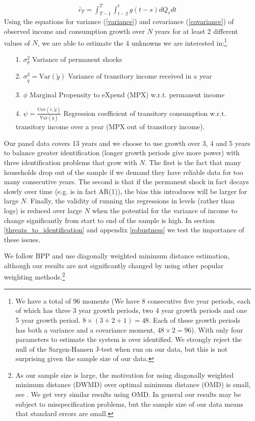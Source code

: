 \documentclass[titlepage]{\econtex}\newcommand{\texname}{ConsumptionHeterogeneity}
\begin{document}
\begin{align}
\tilde{c_T} = \int_{T-1}^{T}\int_{t-2}^{t} g(t-s)dQ_s dt \label{tot_cons}
\end{align}
Using the equations for variance (\ref{variance}) and covariance (\ref{covariance}) of observed income and consumption growth over $N$ years for at least 2 different values of $N$, we are able to estimate the 4 unknowns we are interested in:\footnote{We have a total of 96 moments (We have 8 consecutive five year periods, each of which has three 3 year growth periods, two 4 year growth periods and one 5 year growth period. $8\times(3+2+1)=48$. Each of these growth periods has both a variance and a covariance moment, $48\times 2 = 96$). With only four parameters to estimate the system is over identified. We strongly reject the null of the Sargen-Hansen J-test when run on our data, but this is not surprising given the sample size of our data.}
	\begin{itemize}
	\item[1.] $\sigma^2_p$ Variance of permanent shocks
	\item[2.] $\sigma^2_{\tilde{q}} = \mathrm{Var}(\tilde{y})$ Variance of transitory income received in a year
	\item[3.] $\phi$ Marginal Propensity to eXpend (MPX) w.r.t. permanent income
	\item[4.] $\psi = \frac{\mathrm{Cov}(\tilde{c},\tilde{y})}{\mathrm{Var}(\tilde{y})}$ Regression coefficient of transitory consumption w.r.t. transitory income over a year (MPX out of transitory income).
\end{itemize}
Our panel data covers 13 years and we choose to use growth over 3, 4 and 5 years to balance greater identification (longer growth periods give more power) with three identification problems that grow with $N$. The first is the fact that many households drop out of the sample if we demand they have reliable data for too many consecutive years. The second is that if the permanent shock in fact decays slowly over time (e.g. is in fact AR(1)), the bias this introduces will be larger for large $N$. Finally, the validity of running the regressions in levels (rather than logs) is reduced over large $N$ when the potential for the variance of income to change significantly from start to end of the sample is high. In section \ref{threats_to_identification} and appendix \ref{robustness} we test the importance of these issues.

We follow BPP and use diagonally weighted minimum distance estimation, although our results are not significantly changed by using other popular weighting methods.\footnote{As our sample size is large, the motivation for using diagonally weighted minimum distance (DWMD) over optimal minimum distance (OMD) is small, see \cite{altonji_small-sample_1996}. We get very similar results using OMD. In general our results may be subject to misspecification problems, but the sample size of our data means that standard errors are small.}
\end{document}
